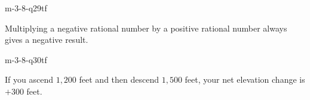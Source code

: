 \begin{practiceQuestion}{m-3-8-q29}{tf}
\begin{questionText}
Multiplying a negative rational number by a positive rational number always gives a negative result.
\end{questionText}
\end{practiceQuestion}

\begin{practiceQuestion}{m-3-8-q30}{tf}
\begin{questionText}
If you ascend $1{,}200$ feet and then descend $1{,}500$ feet, your net elevation change is $+300$ feet.
\end{questionText}
\end{practiceQuestion}

